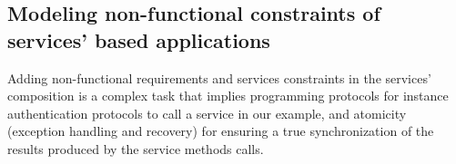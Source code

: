 

\subsection{Modeling non-functional constraints of services' based applications}
Adding non-functional requirements and services constraints in the services' composition is a complex task that implies programming  protocols for instance authentication protocols to call a service in our example, and atomicity (exception handling and recovery) for ensuring a true synchronization of the results produced by the service methods calls.

